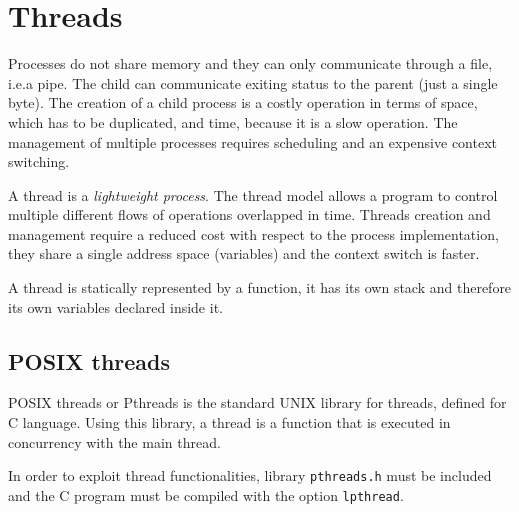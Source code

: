 \chapter{Threads}
Processes do not share memory and they can only communicate through a file, i.e.\@ a pipe. The child can communicate exiting status to the parent (just a single byte). The creation of a child process is a costly operation in terms of space, which has to be duplicated, and time, because it is a slow operation. The management of multiple processes requires scheduling and an expensive context switching.

A thread is a \textit{lightweight process}. The thread model allows a program to control multiple different flows of operations overlapped in time. Threads creation and management require a reduced cost with respect to the process implementation, they share a single address space (variables) and the context switch is faster.

A thread is statically represented by a function, it has its own stack and therefore its own variables declared inside it.

\section{POSIX threads}
POSIX threads or Pthreads is the standard UNIX library for threads, defined for C language. Using this library, a thread is a function that is executed in concurrency with the main thread.

In order to exploit thread functionalities, library \texttt{pthreads.h} must be included and the C program must be compiled with the option \texttt{lpthread}.

